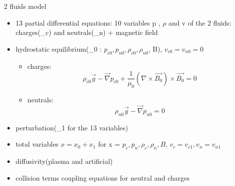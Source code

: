 \documentclass{beamer}
\begin{document}
\begin{frame}{2 fluids model}
\begin{itemize}
\item 13 partial differential equations: 10 variables p , $\rho$ and v of the 2 fluids: charges(\_c) and neutrals(\_n) + magnetic field
\item hydrostatic equilibrium(\_0 : $p_{c0}, p_{n0}, \rho_{c0}, \rho_{n0}$, B), $v_{c0}=v_{n0}=0$
 
\begin{itemize}
\item charges:
\begin{equation}
\rho_{c0}\vec{g} - \vec{\nabla} p_{c0} + \frac{1}{\mu_0} (\nabla \times \vec{B_0}) \times \vec{B_0} = 0
\end{equation}

\item neutrals:
\begin{equation}
\rho_{n0}\vec{g} - \vec{\nabla} p_{n0}  = 0
\end{equation}

\end{itemize}
\item perturbation(\_1 for the 13 variables)

\item total variables  $x = x_0 + x_1$ for x = $p_c,p_n, \rho_c, \rho_n, B$, $v_c = v_{c1},v_n = v_{n1}$
\item diffusivity(plasma and artificial) 
\item collision terms coupling equations for neutral and charges 
\end{itemize}

\end{frame}
\end{document}

